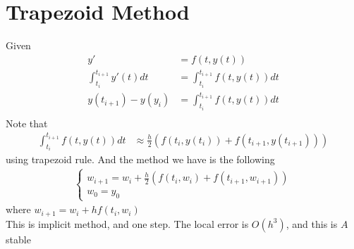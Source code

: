 \documentclass[11pt,oneside]{book}
\theoremstyle{break}
\theoremstyle{break}
\begin{document}
 \section[Trapezoid Method]{Trapezoid Method}
 Given \begin{align*}
 y'&=f(t,y(t))\\
 \int_{t_i}^{t_{i+1}}y'(t)dt&=\int_{t_i}^{t_{i+1}}f(t,y(t))dt\\
 y(t_{i+1})-y(y_i)&=\int_{t_i}^{t_{i+1}}f(t,y(t))dt\\
 \end{align*}
 Note that \begin{align*}
 \int_{t_i}^{t_{i+1}}f(t,y(t))dt&\approx \frac{h}{2}\left( f(t_i,y(t_i))+f(t_{i+1},y(t_{i+1}))\right)
 \end{align*}
 using trapezoid rule. And the method we have is the following \begin{align*}
 \begin{cases}
 w_{i+1}=w_i+\frac{h}{2}\left( f(t_i,w_i)+f(t_{i+1},w_{i+1})\right)\\
 w_0=y_0
 \end{cases}
 \end{align*}
 where $w_{i+1}=w_i+hf(t_i,w_i)$\\
 This is implicit method, and one step. The local error is $O(h^3)$, and this is $A$ stable
\end{document}
